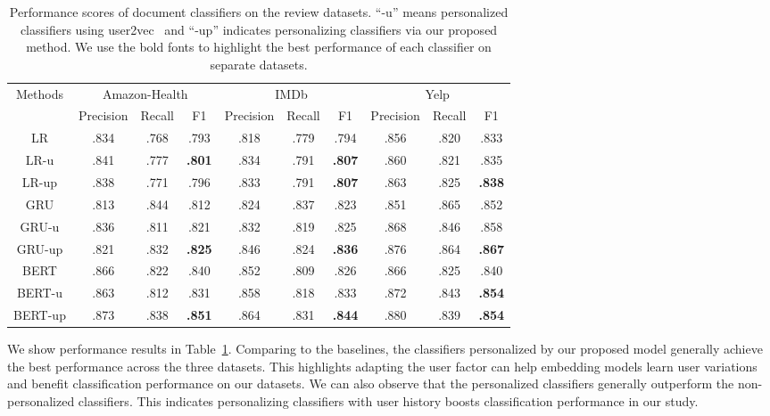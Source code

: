 \begin{table}[t]
\centering
\begin{tabular}{c||ccc|ccc|ccc}
\multirow{2}{*}{Methods} & \multicolumn{3}{c|}{Amazon-Health} & \multicolumn{3}{c|}{IMDb} & \multicolumn{3}{c}{Yelp} \\
 & Precision & Recall & F1 & Precision & Recall & F1 & Precision & Recall & F1 \\\hline\hline
LR & .834 & .768 & .793 & .818 & .779 & .794 & .856 & .820 & .833 \\
LR-u & .841 & .777 & \textbf{.801} & .834 & .791 & \textbf{.807} & .860 & .821 & .835 \\
LR-up & .838 & .771 & .796 & .833 & .791 & \textbf{.807} & .863 & .825 & \textbf{.838} \\\hline
GRU & .813 & .844 & .812 & .824 & .837 & .823 & .851 & .865 & .852 \\
GRU-u & .836 & .811 & .821 & .832 & .819 & .825 & .868 & .846 & .858 \\
GRU-up & .821 & .832 & \textbf{.825} & .846 & .824 & \textbf{.836} & .876 & .864 & \textbf{.867} \\\hline
BERT & .866 & .822 & .840 & .852 & .809 & .826 & .866 & .825 & .840 \\
BERT-u & .863 & .812 & .831 & .858 & .818 & .833 & .872 & .843 & \textbf{.854} \\
BERT-up & .873 & .838 & \textbf{.851} & .864 & .831 & \textbf{.844} & .880 & .839 & \textbf{.854}
\end{tabular}
\caption{Performance scores of document classifiers on the review datasets. ``-u'' means personalized classifiers using user2vec~\cite{amir2017quantifying} and ``-up'' indicates personalizing classifiers via our proposed method. We use the bold fonts to highlight the best performance of each classifier on separate datasets.}
\label{chap4:tab:personalization}
\end{table}


We show performance results in Table~\ref{chap4:tab:personalization}. Comparing to the baselines, the classifiers personalized by our proposed model generally achieve the best performance across the three datasets. 
This highlights adapting the user factor can help embedding models learn user variations and benefit classification performance on our datasets.
We can also observe that the personalized classifiers generally outperform the non-personalized classifiers.
This indicates personalizing classifiers with user history boosts classification performance in our study.



